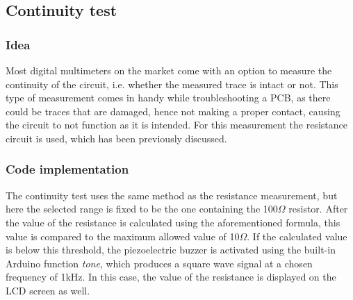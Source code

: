 \subsection{Continuity test}
\label{sec:method_continuity}

\subsubsection{Idea}
Most digital multimeters on the market come with an option to measure the continuity of the circuit, i.e. whether the measured trace is intact or not. This type of measurement comes in handy while troubleshooting a PCB, as there could be traces that are damaged, hence not making a proper contact, causing the circuit to not function as it is intended. For this measurement the resistance circuit is used, which has been previously discussed. 

\subsubsection{Code implementation}
The continuity test uses the same method as the resistance measurement, but here the selected range is fixed to be the one containing the 100$\Omega$ resistor. After the value of the resistance is calculated using the aforementioned formula, this value is compared to the maximum allowed value of 10$\Omega$. If the calculated value is below this threshold, the piezoelectric buzzer is activated using the built-in Arduino function \textit{tone}, which produces a square wave signal at a chosen frequency of 1kHz. In this case, the value of the resistance is displayed on the LCD screen as well.